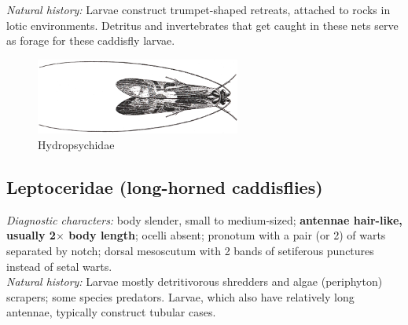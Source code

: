 \documentclass[letterpaper, 11pt]{article}
\begin{document}
\noindent{}\textit{Natural history:} Larvae construct trumpet-shaped retreats, attached to rocks in lotic environments. Detritus and invertebrates that get caught in these nets serve as forage for these caddisfly larvae. 

\begin{figure}[ht!]
  \centering
    \includegraphics[width=0.6\textwidth]{TrichoImage04}
  \caption{Hydropsychidae}
  \label{fig:hydropsy}
\end{figure}

\subsection{Leptoceridae (long-horned caddisflies)}%
\noindent{}\textit{Diagnostic characters:} body slender, small to medium-sized; \textbf{antennae hair-like, usually 2$\times$ body length}; ocelli absent; pronotum with a pair (or 2) of warts separated by notch; dorsal mesoscutum with 2 bands of setiferous punctures instead of setal warts.\\

\noindent{}\textit{Natural history:} Larvae mostly detritivorous shredders and algae (periphyton) scrapers; some species predators. Larvae, which also have relatively long antennae, typically construct tubular cases.
\end{document}
